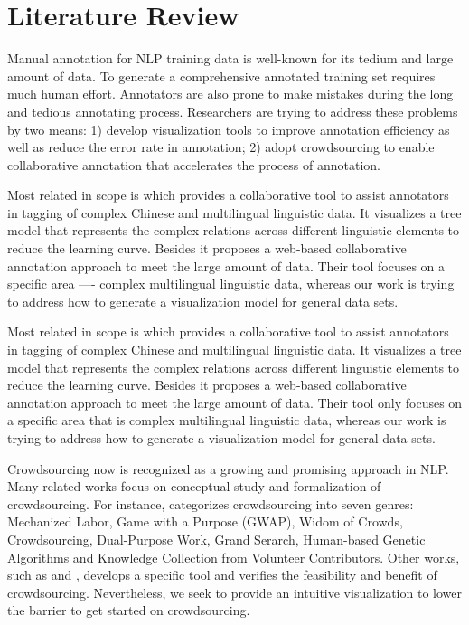\section{Literature Review}

Manual annotation for NLP training data is well-known for its tedium
and large amount of data. To generate a comprehensive annotated
training set requires much human effort. Annotators are also prone to
make mistakes during the long and tedious annotating process.
Researchers are trying to address these problems by two means: 1)
develop visualization tools to improve annotation efficiency as well
as reduce the error rate in annotation; 2) adopt crowdsourcing to
enable collaborative annotation that accelerates the process of
annotation.

Most related in scope is \cite{yan2012collaborative} which provides a
collaborative tool to assist annotators in tagging of complex Chinese
and multilingual linguistic data. It visualizes a tree model that
represents the complex relations across different linguistic elements
to reduce the learning curve. Besides it proposes a web-based
collaborative annotation approach to meet the large amount of data.
Their tool focuses on a specific area ---- complex multilingual
linguistic data, whereas our work is trying to address how to generate
a visualization model for general data sets.

Most related in scope is \cite{yan2012collaborative} which provides a
collaborative tool to assist annotators in tagging of complex Chinese
and multilingual linguistic data. It visualizes a tree model that
represents the complex relations across different linguistic elements
to reduce the learning curve. Besides it proposes a web-based
collaborative annotation approach to meet the large amount of data.
Their tool only focuses on a specific area that is complex
multilingual linguistic data, whereas our work is trying to address
how to generate a visualization model for general data sets.

Crowdsourcing now is recognized as a growing and promising approach in
NLP. Many related works focus on conceptual study and formalization of
crowdsourcing. For instance, \cite{quinn2009taxonomy} categorizes
crowdsourcing into seven genres: Mechanized Labor, Game with a Purpose
(GWAP), Widom of Crowds, Crowdsourcing, Dual-Purpose Work, Grand
Serarch, Human-based Genetic Algorithms and Knowledge Collection from
Volunteer Contributors. Other works, such as
\cite{abekawa2010community} and \cite{irvine2010using}, develops a
specific tool and verifies the feasibility and benefit of
crowdsourcing. Nevertheless, we seek to provide an intuitive
visualization to lower the barrier to get started on crowdsourcing. 

